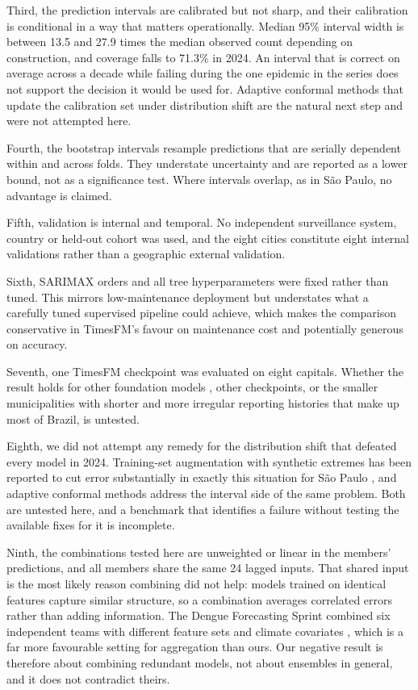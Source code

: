 \documentclass[11pt]{article}
\begin{document}
Third, the prediction intervals are calibrated but not sharp, and their calibration is
conditional in a way that matters operationally. Median 95\% interval width is between
13.5 and 27.9 times the median observed count depending on construction, and coverage
falls to 71.3\% in 2024. An interval that is correct on average across a decade while
failing during the one epidemic in the series does not support the decision it would be
used for. Adaptive conformal methods that update the calibration set under distribution
shift \citep{Gibbs2021adaptive} are the natural next step and were not attempted here.

Fourth, the bootstrap intervals resample predictions that are serially dependent within
and across folds. They understate uncertainty and are reported as a lower bound, not as a
significance test. Where intervals overlap, as in S\~ao Paulo, no advantage is claimed.

Fifth, validation is internal and temporal. No independent surveillance system,
country or held-out cohort was used, and the eight cities constitute eight internal
validations rather than a geographic external validation.

Sixth, SARIMAX orders and all tree hyperparameters were fixed rather than tuned. This
mirrors low-maintenance deployment but understates what a carefully tuned supervised
pipeline could achieve, which makes the comparison conservative in TimesFM's favour on
maintenance cost and potentially generous on accuracy.

Seventh, one TimesFM checkpoint was evaluated on eight capitals. Whether the result holds
for other foundation models \citep{Ansari2024chronos,Woo2024moirai}, other checkpoints,
or the smaller municipalities with shorter and more irregular reporting histories that
make up most of Brazil, is untested.

Eighth, we did not attempt any remedy for the distribution shift that defeated every
model in 2024. Training-set augmentation with synthetic extremes has been reported to cut
error substantially in exactly this situation for S\~ao Paulo
\citep{Bannoud2026augment}, and adaptive conformal methods \citep{Gibbs2021adaptive}
address the interval side of the same problem. Both are untested here, and a benchmark
that identifies a failure without testing the available fixes for it is incomplete.

Ninth, the combinations tested here are unweighted or linear in the members'
predictions, and all members share the same 24 lagged inputs. That shared input is the
most likely reason combining did not help: models trained on identical features capture
similar structure, so a combination averages correlated errors rather than adding
information. The Dengue Forecasting Sprint combined six independent teams with different
feature sets and climate covariates \citep{Araujo2026sprint}, which is a far more
favourable setting for aggregation than ours. Our negative result is therefore about
combining redundant models, not about ensembles in general, and it does not contradict
theirs.
\end{document}

